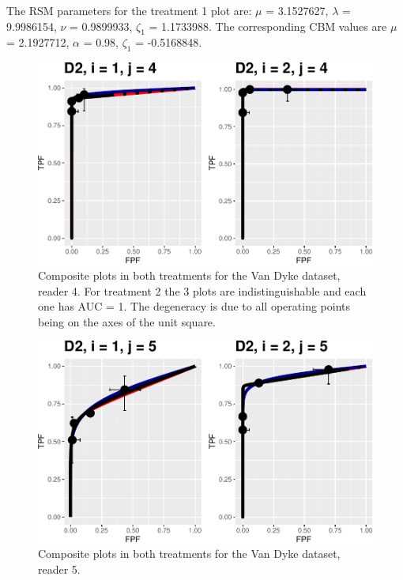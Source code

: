 \documentclass[
]{book}
\begin{document}
The RSM parameters for the treatment 1 plot are: \(\mu\) = 3.1527627, \(\lambda\) = 9.9986154, \(\nu\) = 0.9899933, \(\zeta_1\) = 1.1733988. The corresponding CBM values are \(\mu\) = 2.1927712, \(\alpha\) = 0.98, \(\zeta_1\) = -0.5168848.

\begin{figure}
\centering
\includegraphics{12-rsm-3-fits_files/figure-latex/rsm-3-fits-plots-vd-1-4-1.pdf}
\caption{\label{fig:rsm-3-fits-plots-vd-1-4}Composite plots in both treatments for the Van Dyke dataset, reader 4. For treatment 2 the 3 plots are indistinguishable and each one has AUC = 1. The degeneracy is due to all operating points being on the axes of the unit square.}
\end{figure}

\begin{figure}
\centering
\includegraphics{12-rsm-3-fits_files/figure-latex/rsm-3-fits-plots-vd-1-5-1.pdf}
\caption{\label{fig:rsm-3-fits-plots-vd-1-5}Composite plots in both treatments for the Van Dyke dataset, reader 5.}
\end{figure}
\end{document}
